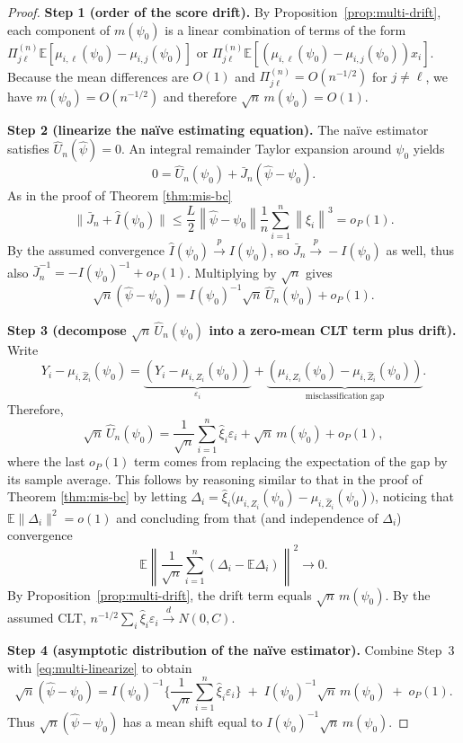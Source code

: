 \documentclass[11pt]{article}
\theoremstyle{definition}
\theoremstyle{remark}
\newcommand{\E}{\mathbb{E}}
\newcommand{\toP}{\xrightarrow{\,p\,}}
\newcommand{\tod}{\xrightarrow{\,d\,}}
\begin{document}
\begin{proof}
\textbf{Step 1 (order of the score drift).}
By Proposition~\ref{prop:multi-drift}, each component of $m(\psi_0)$ is a linear combination of terms of the form
$\Pi_{j\ell}^{(n)}\E[\mu_{i,\ell}(\psi_0)-\mu_{i,j}(\psi_0)]$ or
$\Pi_{j\ell}^{(n)}\E[(\mu_{i,\ell}(\psi_0)-\mu_{i,j}(\psi_0))x_i]$.
Because the mean differences are $O(1)$ and $\Pi_{j\ell}^{(n)}=O(n^{-1/2})$ for $j\neq \ell$,
we have $m(\psi_0)=O(n^{-1/2})$ and therefore $\sqrt{n}\,m(\psi_0)=O(1)$.

\textbf{Step 2 (linearize the na\"ive estimating equation).}
The na\"ive estimator satisfies $\hat U_n(\hat\psi)=0$.
An integral remainder Taylor expansion around $\psi_0$ yields
\[
0=\hat U_n(\psi_0)+\bar J_n(\hat\psi-\psi_0).
\]
As in the proof of Theorem \ref{thm:mis-bc}
\[ \|\bar J_n + \hat I (\psi_0) \| \leq \frac{L}{2} \left\|\hat\psi - \psi_0 \right\| \frac{1}{n}\sum_{i=1}^n\left\| \hat\xi_i\right\|^3 = o_P(1). \]
By the assumed convergence $\hat I(\psi_0)\toP I(\psi_0)$, so
$\bar J_n \toP -I(\psi_0)$ as well, thus also $\bar J_n^{-1}=-I(\psi_0)^{-1}+o_P(1)$.
Multiplying by $\sqrt{n}$ gives
\begin{equation}
\sqrt{n}(\hat\psi-\psi_0)=I(\psi_0)^{-1}\sqrt{n}\,\hat U_n(\psi_0)+o_P(1).
\label{eq:multi-linearize}
\end{equation}

\textbf{Step 3 (decompose $\sqrt{n}\,\hat U_n(\psi_0)$ into a zero-mean CLT term plus drift).}
Write
\[
Y_i-\mu_{i,\hat Z_i}(\psi_0)
=\underbrace{(Y_i-\mu_{i,Z_i}(\psi_0))}_{\varepsilon_i}
+\underbrace{(\mu_{i,Z_i}(\psi_0)-\mu_{i,\hat Z_i}(\psi_0))}_{\text{misclassification gap}}.
\]
Therefore,
\[
\sqrt{n}\,\hat U_n(\psi_0)
=\frac{1}{\sqrt{n}}\sum_{i=1}^n \hat\xi_i\varepsilon_i
+\sqrt{n}\,m(\psi_0)
+o_P(1),
\]
where the last $o_P(1)$ term comes from replacing the expectation of the gap by its sample average. This follows by reasoning similar to that in the proof of Theorem \ref{thm:mis-bc} by letting $\Delta_i = \hat\xi_i \big( \mu_{i, Z_i} (\psi_0) - \mu_{i, \hat Z_i}(\psi_0)\big)$, noticing that $\E \| \Delta_i \|^2=o(1)$ and concluding from that (and independence of $\Delta_i$) convergence
\[ \E \left\| \frac{1}{\sqrt{n}} \sum_{i=1}^n (\Delta_i - \E \Delta_i) \right\|^2 \to 0. \]
By Proposition~\ref{prop:multi-drift}, the drift term equals $\sqrt{n}\,m(\psi_0)$.
By the assumed CLT, $n^{-1/2}\sum_i\hat\xi_i\varepsilon_i\tod N(0,C)$.

\textbf{Step 4 (asymptotic distribution of the na\"ive estimator).}
Combine Step~3 with \eqref{eq:multi-linearize} to obtain
\[
\sqrt{n}(\hat\psi-\psi_0)
=I(\psi_0)^{-1}\Big\{\frac{1}{\sqrt{n}}\sum_{i=1}^n \hat\xi_i\varepsilon_i\Big\}
\;+\;I(\psi_0)^{-1}\sqrt{n}\,m(\psi_0)\;+\;o_P(1).
\]
Thus $\sqrt{n}(\hat\psi-\psi_0)$ has a mean shift equal to $I(\psi_0)^{-1}\sqrt{n}\,m(\psi_0)$.


\end{proof}
\end{document}
